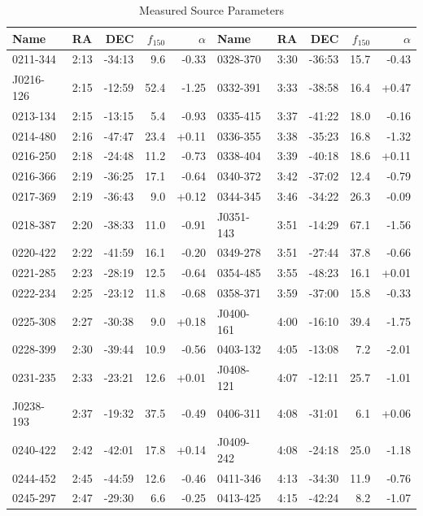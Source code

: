 \documentclass[preprint]{aastex}
\begin{document}
\begin{table}[ht]
\caption{Measured Source Parameters}
\begin{tabular}{l|lrrr||l|lrrr}
\hline
Name & RA & DEC & $f_{150}$ & $\alpha$ & Name & RA & DEC & $f_{150}$ & $\alpha$
\\
\hline
  0211-344 &  2:13 & -34:13 &    9.6 & -0.33 &   0328-370 &  3:30 & -36:53 &   15.7 & -0.43 \\
 J0216-126 &  2:15 & -12:59 &   52.4 & -1.25 &   0332-391 &  3:33 & -38:58 &   16.4 & +0.47 \\
  0213-134 &  2:15 & -13:15 &    5.4 & -0.93 &   0335-415 &  3:37 & -41:22 &   18.0 & -0.16 \\
  0214-480 &  2:16 & -47:47 &   23.4 & +0.11 &   0336-355 &  3:38 & -35:23 &   16.8 & -1.32 \\
  0216-250 &  2:18 & -24:48 &   11.2 & -0.73 &   0338-404 &  3:39 & -40:18 &   18.6 & +0.11 \\
  0216-366 &  2:19 & -36:25 &   17.1 & -0.64 &   0340-372 &  3:42 & -37:02 &   12.4 & -0.79 \\
  0217-369 &  2:19 & -36:43 &    9.0 & +0.12 &   0344-345 &  3:46 & -34:22 &   26.3 & -0.09 \\
  0218-387 &  2:20 & -38:33 &   11.0 & -0.91 &  J0351-143 &  3:51 & -14:29 &   67.1 & -1.56 \\
  0220-422 &  2:22 & -41:59 &   16.1 & -0.20 &   0349-278 &  3:51 & -27:44 &   37.8 & -0.66 \\
  0221-285 &  2:23 & -28:19 &   12.5 & -0.64 &   0354-485 &  3:55 & -48:23 &   16.1 & +0.01 \\
  0222-234 &  2:25 & -23:12 &   11.8 & -0.68 &   0358-371 &  3:59 & -37:00 &   15.8 & -0.33 \\
  0225-308 &  2:27 & -30:38 &    9.0 & +0.18 &  J0400-161 &  4:00 & -16:10 &   39.4 & -1.75 \\
  0228-399 &  2:30 & -39:44 &   10.9 & -0.56 &   0403-132 &  4:05 & -13:08 &    7.2 & -2.01 \\
  0231-235 &  2:33 & -23:21 &   12.6 & +0.01 &  J0408-121 &  4:07 & -12:11 &   25.7 & -1.01 \\
 J0238-193 &  2:37 & -19:32 &   37.5 & -0.49 &   0406-311 &  4:08 & -31:01 &    6.1 & +0.06 \\
  0240-422 &  2:42 & -42:01 &   17.8 & +0.14 &  J0409-242 &  4:08 & -24:18 &   25.0 & -1.18 \\
  0244-452 &  2:45 & -44:59 &   12.6 & -0.46 &   0411-346 &  4:13 & -34:30 &   11.9 & -0.76 \\
  0245-297 &  2:47 & -29:30 &    6.6 & -0.25 &   0413-425 &  4:15 & -42:24 &    8.2 & -1.07 \\

\end{tabular}
\end{table}
\end{document}
